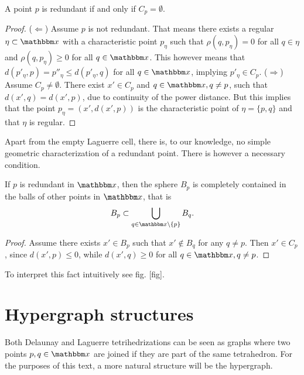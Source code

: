 \begin{proposition}
	A point $p$ is redundant if and only if $C_p=\emptyset$.
\end{proposition}
\begin{proof}
	($\Leftarrow$) Assume $p$ is not redundant. That means there exists a regular $\eta\subset \x$ with a characteristic point $p_\eta$ such that $\rho(q,p_\eta)=0$ for all $q\in\eta$ and $\rho(q,p_\eta)\geq 0$ for all $q\in \x$. This however means that $d(p'_\eta,p) = p''_\eta \leq d(p'_\eta,q)$ for all $q\in\x$, implying $p'_\eta \in C_p$. \newline
	($\Rightarrow$) Assume $C_p \neq \emptyset$. There exist $x' \in C_p$ and $q\in\x, q\neq p$, such that $d(x',q)=d(x',p)$, due to continuity of the power distance. But this implies that the point $p_\eta = (x', d(x',p))$ is the characteristic point of $\eta=\{p,q\}$ and that $\eta$ is regular.
\end{proof}

Apart from the empty Laguerre cell, there is, to our knowledge, no simple geometric characterization of a redundant point. There is however a necessary condition.

\begin{proposition}
	If $p$ is redundant in $\x$, then the sphere $B_p$ is completely contained in the balls of other points in $\x$, that is 
	$$B_p \subset \bigcup_{q \in \x\setminus \{p\}} B_q.$$
\end{proposition}
\begin{proof}
	Assume there exists $x' \in B_p$ such that $x' \notin B_q$ for any $q\neq p$. Then $x' \in C_p$, since $d(x', p) \leq 0$, while $d(x',q) \geq 0$ for all $q\in \x, q\neq p$.
\end{proof}


To interpret this fact intuitively see fig. [fig]. 







\section{Hypergraph structures}
Both Delaunay and Laguerre tetrihedrizations can be seen as graphs where two points $p,q\in\x$ are joined if they are part of the same tetrahedron. For the purposes of this text, a more natural structure will be the hypergraph.

